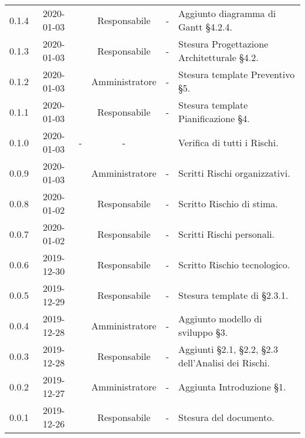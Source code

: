 {\begin{longtable}{ c c  C{2.3cm} c C{3cm} C{3.2cm}}
0.1.4 & 2020-01-03 & \SE{} & Responsabile & - & Aggiunto diagramma di Gantt §4.2.4. \\
0.1.3 & 2020-01-03 & \SE{} & Responsabile & - & Stesura Progettazione Architetturale §4.2.\\
0.1.2 & 2020-01-03 & \LD{} & Amministratore & - & Stesura template Preventivo §5. \\
0.1.1 & 2020-01-03 & \SE{} & Responsabile & - & Stesura template Pianificazione §4. \\
0.1.0 & 2020-01-03 & - & - & \AT{} & Verifica di tutti i Rischi. \\
0.0.9 & 2020-01-03 & \LD{} & Amministratore & - & Scritti Rischi organizzativi. \\
0.0.8 & 2020-01-02 & \SE{} & Responsabile & - & Scritto Rischio di stima. \\
0.0.7 & 2020-01-02 & \SE{} & Responsabile & - & Scritti Rischi personali. \\
0.0.6 & 2019-12-30 & \SE{} & Responsabile & - & Scritto Rischio tecnologico. \\
0.0.5 & 2019-12-29 & \SE{} & Responsabile & - & Stesura template di §2.3.1. \\
0.0.4 & 2019-12-28 & \LD{} & Amministratore & - & Aggiunto modello di sviluppo §3. \\
0.0.3 & 2019-12-28 & \SE{} & Responsabile & - & Aggiunti §2.1, §2.2, §2.3 dell'Analisi dei Rischi. \\
0.0.2 & 2019-12-27 & \LD{} & Amministratore & - & Aggiunta Introduzione §1. \\
0.0.1 & 2019-12-26 & \SE{} & Responsabile & - & Stesura del documento. \\
		
\end{longtable}
}